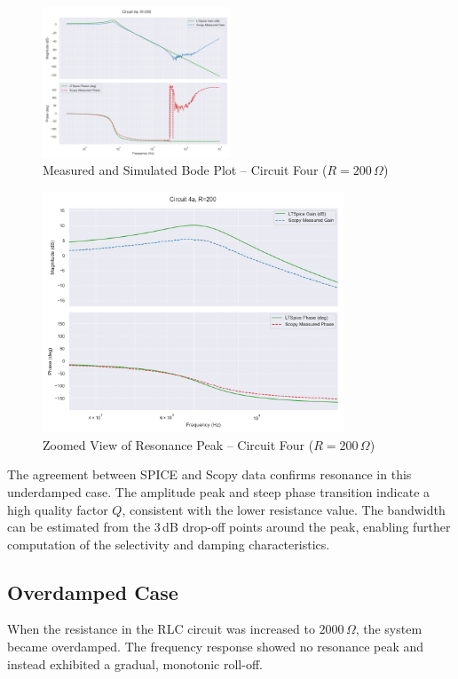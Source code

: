 \documentclass[12pt]{article}
\begin{document}
\begin{figure}[H]
	\centering
	\includegraphics[width=0.5\textwidth]{e6_bode4}
	\caption{Measured and Simulated Bode Plot – Circuit Four ($R = 200\,\Omega$)}
\end{figure}

\begin{figure}[H]
	\centering
	\includegraphics[width=0.8\textwidth]{e6_bandbode}
	\caption{Zoomed View of Resonance Peak – Circuit Four ($R = 200\,\Omega$)}
\end{figure}

The agreement between SPICE and Scopy data confirms resonance in this underdamped case. The amplitude peak and steep phase transition indicate a high quality factor \( Q \), consistent with the lower resistance value. The bandwidth can be estimated from the 3\,dB drop-off points around the peak, enabling further computation of the selectivity and damping characteristics.

\subsection{Overdamped Case}

When the resistance in the RLC circuit was increased to $2000\,\Omega$, the system became overdamped. The frequency response showed no resonance peak and instead exhibited a gradual, monotonic roll-off.
\end{document}
